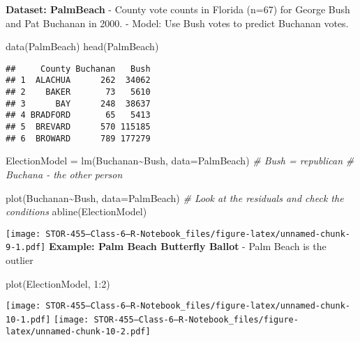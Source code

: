 \documentclass[
]{article}
\newenvironment{Shaded}{\begin{snugshade}}{\end{snugshade}}
\newcommand{\AttributeTok}[1]{\textcolor[rgb]{0.77,0.63,0.00}{#1}}
\newcommand{\CommentTok}[1]{\textcolor[rgb]{0.56,0.35,0.01}{\textit{#1}}}
\newcommand{\DecValTok}[1]{\textcolor[rgb]{0.00,0.00,0.81}{#1}}
\newcommand{\FunctionTok}[1]{\textcolor[rgb]{0.00,0.00,0.00}{#1}}
\newcommand{\NormalTok}[1]{#1}
\newcommand{\OtherTok}[1]{\textcolor[rgb]{0.56,0.35,0.01}{#1}}
\newcommand{\SpecialCharTok}[1]{\textcolor[rgb]{0.00,0.00,0.00}{#1}}
\begin{document}
\textbf{Dataset: PalmBeach} - County vote counts in Florida (n=67) for
George Bush and Pat Buchanan in 2000. - Model: Use Bush votes to predict
Buchanan votes.

\begin{Shaded}
\begin{Highlighting}[]
\FunctionTok{data}\NormalTok{(PalmBeach)}
\FunctionTok{head}\NormalTok{(PalmBeach)}
\end{Highlighting}
\end{Shaded}

\begin{verbatim}
##     County Buchanan   Bush
## 1  ALACHUA      262  34062
## 2    BAKER       73   5610
## 3      BAY      248  38637
## 4 BRADFORD       65   5413
## 5  BREVARD      570 115185
## 6  BROWARD      789 177279
\end{verbatim}

\begin{Shaded}
\begin{Highlighting}[]
\NormalTok{ElectionModel }\OtherTok{=} \FunctionTok{lm}\NormalTok{(Buchanan}\SpecialCharTok{\textasciitilde{}}\NormalTok{Bush, }\AttributeTok{data=}\NormalTok{PalmBeach)}
\CommentTok{\# Bush = republican }
\CommentTok{\# Buchana {-} the other person }

\FunctionTok{plot}\NormalTok{(Buchanan}\SpecialCharTok{\textasciitilde{}}\NormalTok{Bush, }\AttributeTok{data=}\NormalTok{PalmBeach) }\CommentTok{\# Look at the residuals and check the conditions }
\FunctionTok{abline}\NormalTok{(ElectionModel)}
\end{Highlighting}
\end{Shaded}

\texttt{[image: STOR-455---Class-6---R-Notebook\_files/figure-latex/unnamed-chunk-9-1.pdf]}
\textbf{Example: Palm Beach Butterfly Ballot} - Palm Beach is the
outlier

\begin{Shaded}
\begin{Highlighting}[]
\FunctionTok{plot}\NormalTok{(ElectionModel, }\DecValTok{1}\SpecialCharTok{:}\DecValTok{2}\NormalTok{)}
\end{Highlighting}
\end{Shaded}

\texttt{[image: STOR-455---Class-6---R-Notebook\_files/figure-latex/unnamed-chunk-10-1.pdf]}
\texttt{[image: STOR-455---Class-6---R-Notebook\_files/figure-latex/unnamed-chunk-10-2.pdf]}

\begin{Shaded}
\end{Shaded}
\end{document}
